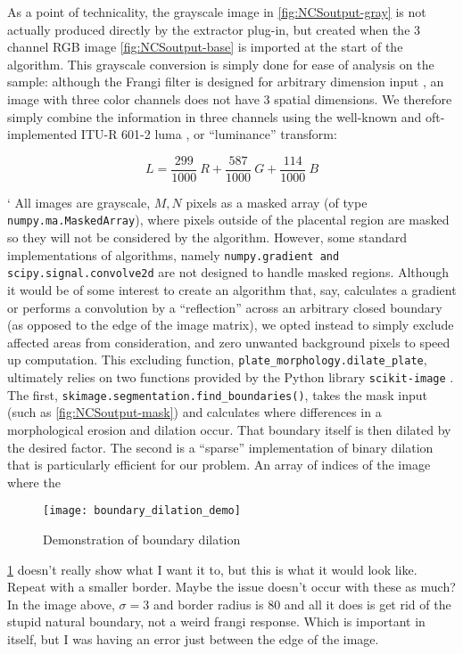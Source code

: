 	As a point of technicality, the grayscale image in \cref{fig:NCSoutput-gray} is not actually produced directly by the extractor plug-in, but created when the 3 channel RGB image \cref{fig:NCSoutput-base} is imported at the start of the algorithm. This grayscale conversion is simply done for ease of analysis on the sample: although the Frangi filter is designed for arbitrary dimension input \cite{frangi1998multiscale}, an image with three color channels does not have 3 spatial dimensions. We therefore simply combine the information in three channels using the well-known and oft-implemented ITU-R 601-2 luma \cite{scipy}, or ``luminance'' transform:
	
	\begin{equation} \label{eq:luma_transform}
	L =  \frac{299}{1000}\ R + \frac{587}{1000}\ G + \frac{114}{1000}\ B
	\end{equation}

`	All images are grayscale, $M,N$ pixels as a masked array (of type
	\texttt{numpy.ma.MaskedArray}), where pixels outside of the placental region are masked so they will not be considered by the algorithm. However, some standard
	implementations of algorithms, namely \texttt{numpy.gradient and scipy.signal.convolve2d} are not designed to handle masked regions. Although it would be of some interest to create an algorithm that, say, calculates a gradient or performs a convolution by a ``reflection'' across an arbitrary closed boundary (as opposed to the edge of the image matrix), we opted instead to simply exclude affected areas from consideration, and zero unwanted background pixels to speed up computation. This excluding function,
	\texttt{plate\_morphology.dilate\_plate}, ultimately relies on two functions
	provided by the Python library \texttt{scikit-image} \cite{skimage}. The first, \texttt{skimage.segmentation.find\_boundaries()}, takes the mask input (such as \cref{fig:NCSoutput-mask}) and calculates where differences in a morphological erosion and dilation occur. That boundary itself is then dilated by the desired factor. The second is a ``sparse'' implementation of binary dilation that is particularly efficient for our problem. An array of indices of the image where the 
	
	\begin{figure}  \label{fig:boundary-demo}
		\texttt{[image: boundary\_dilation\_demo]}
		\caption{Demonstration of boundary dilation}
	\end{figure}
	
	\cref{fig:boundary-demo} doesn't really show what I want it to, but this is what it would look like. Repeat with a smaller border. Maybe the issue doesn't occur with these as much? 	In the image above, $\sigma=3$ and border radius is 80 and all it does is get 	rid of the stupid natural boundary, not a weird frangi response. Which is important in itself, but I was having an error just between the edge of the image.
	
